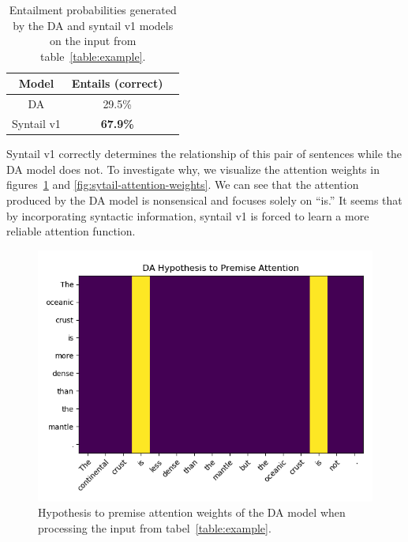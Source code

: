 \documentclass[11pt,a4paper]{article}
\begin{document}
\begin{table}[h]
    \centering
    \begin{tabular}{c c c}
        \toprule
         Model & Entails (correct) \\
         \midrule
         DA & 29.5\% \\
         Syntail v1 & \textbf{67.9\%} \\
         \bottomrule
    \end{tabular}
    \caption{Entailment probabilities generated by the DA and syntail v1 models on the input
             from table~\ref{table:example}.}
\label{table:pred-example}
\end{table}

Syntail v1 correctly determines the relationship of this pair of sentences
while the DA model does not.
To investigate why, we visualize the attention weights in figures~\ref{fig:da-attention-weights}
and \ref{fig:sytail-attention-weights}.
We can see that the attention produced by the DA model is nonsensical and focuses solely on
``is.'' It seems that by incorporating syntactic information, syntail v1 is forced to learn
a more reliable attention function.

\begin{figure}[h]
    \centering
    \includegraphics[width=\linewidth]{figures/da-h2p-attention.png}
    \caption{Hypothesis to premise attention weights of the DA model when processing
             the input from tabel~\ref{table:example}.}
    \label{fig:da-attention-weights}
\end{figure}
\end{document}
